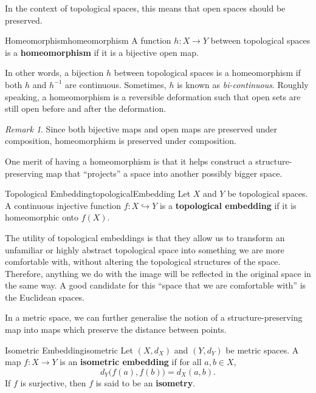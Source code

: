 \documentclass[math]{amznotes}
\theoremstyle{remark}
\newtheorem*{remark}{Remark}
\begin{document}
In the context of topological spaces, this means that open spaces should be preserved.
\begin{dfnbox}{Homeomorphism}{homeomorphism}
    A function $h \colon X \to Y$ between topological spaces is a {\color{red} \textbf{homeomorphism}} if it is a bijective open map.
\end{dfnbox}
In other words, a bijection $h$ between topological spaces is a homeomorphism if both $h$ and $h^{-1}$ are continuous. Sometimes, $h$ is known as \textit{bi-continuous}. Roughly speaking, a homeomorphism is a reversible deformation such that open sets are still open before and after the deformation. 
\begin{notebox}
    \begin{remark}
        Since both bijective maps and open maps are preserved under composition, homeomorphism is preserved under composition.
    \end{remark}
\end{notebox}
One merit of having a homeomorphism is that it helps construct a structure-preserving map that ``projects'' a space into another possibly bigger space.
\begin{dfnbox}{Topological Embedding}{topologicalEmbedding}
    Let $X$ and $Y$ be topological spaces. A continuous injective function $f \colon X \hookrightarrow Y$ is a {\color{red} \textbf{topological embedding}} if it is homeomorphic onto $f\left(X\right)$.
\end{dfnbox}
The utility of topological embeddings is that they allow us to transform an unfamiliar or highly abstract topological space into something we are more comfortable with, without altering the topological structures of the space. Therefore, anything we do with the image will be reflected in the original space in the same way. A good candidate for this ``space that we are comfortable with'' is the Euclidean spaces.

In a metric space, we can further generalise the notion of a structure-preserving map into maps which preserve the distance between points.
\begin{dfnbox}{Isometric Embedding}{isometric}
    Let $\left(X, d_X\right)$ and $\left(Y, d_Y\right)$ be metric spaces. A map $f \colon X \to Y$ is an {\color{red} \textbf{isometric embedding}} if for all $a, b \in X$,
    \begin{equation*}
        d_Y\bigl(f\left(a\right), f\left(b\right)\bigr) = d_X\left(a, b\right).
    \end{equation*}
    If $f$ is surjective, then $f$ is said to be an {\color{red} \textbf{isometry}}.
\end{dfnbox}
\end{document}
